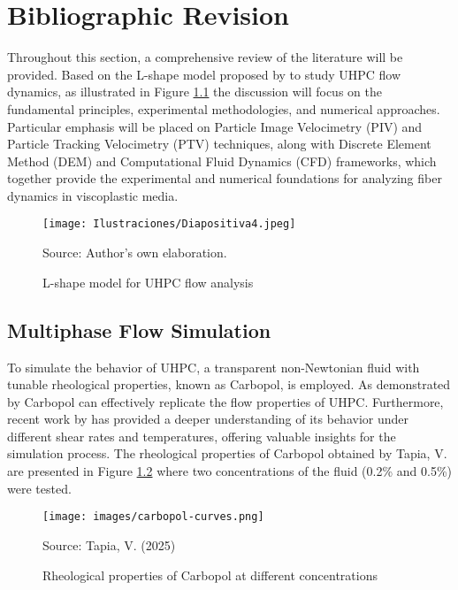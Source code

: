 
\chapter{Bibliographic Revision}
\label{litRev} %

Throughout this section, a comprehensive review of the literature will be provided. Based on the L-shape model proposed by \cite{huang2018improvement} to study UHPC flow dynamics, as illustrated in Figure \ref{lshapemodel} the discussion will focus on the fundamental principles, experimental methodologies, and numerical approaches.  Particular emphasis will be placed on Particle Image Velocimetry (PIV) and Particle Tracking Velocimetry (PTV) techniques, along with Discrete Element Method (DEM) and Computational Fluid Dynamics (CFD) frameworks, which together provide the experimental and numerical foundations for analyzing fiber dynamics in viscoplastic media.

\begin{figure}[htb]
    \centering
    \texttt{[image: Ilustraciones/Diapositiva4.jpeg]}
    \caption{L-shape model for UHPC flow analysis}
    Source: Author's own elaboration.
    \label{lshapemodel}
\end{figure}

\section{Multiphase Flow Simulation}

To simulate the behavior of UHPC, a transparent non-Newtonian fluid with tunable rheological properties, known as Carbopol, is employed. As demonstrated by \cite{auernhammer2020transparent} Carbopol can effectively replicate the flow properties of UHPC. Furthermore, recent work by \cite{tapia2025} has provided a deeper understanding of its behavior under different shear rates and temperatures, offering valuable insights for the simulation process. The rheological properties of Carbopol obtained by Tapia, V. are presented in Figure \ref{carbopolrheology} where two concentrations of the fluid (0.2\% and 0.5\%) were tested.


\begin{figure}[htb]
    \centering
    \texttt{[image: images/carbopol-curves.png]}
    \caption{Rheological properties of Carbopol at different concentrations}
    Source: Tapia, V. (2025)
    \label{carbopolrheology}
\end{figure}

